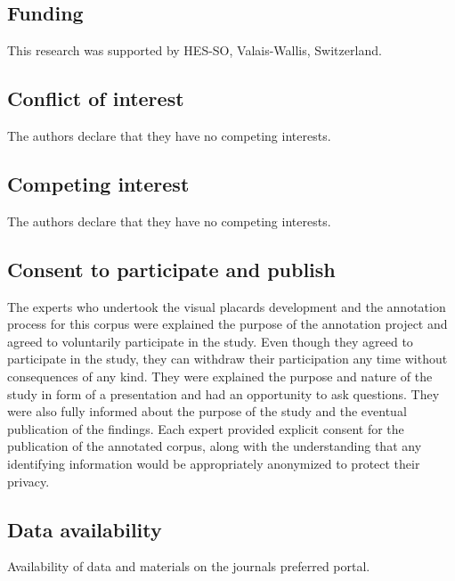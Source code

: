 \documentclass[sn-mathphys,Numbered]{sn-jnl}%
\theoremstyle{thmstyleone}%
\theoremstyle{thmstyletwo}%
\theoremstyle{thmstylethree}%
\begin{document}
\subsection*{Funding}
%
This research was supported by HES-SO, Valais-Wallis, Switzerland. 
%
%
%
\subsection*{Conflict of interest}
%
The authors declare that they have no competing interests.
%
%
%
\subsection*{Competing interest}
%
The authors declare that they have no competing interests.
%
%
%
%
%
%
%
\subsection*{Consent to participate and publish}
%
The experts who undertook the visual placards development and the annotation process for this corpus were explained the purpose of the annotation project and agreed to voluntarily participate in the study.
Even though they agreed to participate in the study, they can withdraw their participation any time without consequences of any kind.
They were explained the purpose and nature of the study in form of a presentation and had an opportunity to ask questions.
They were also fully informed about the purpose of the study and the eventual publication of the findings.
Each expert provided explicit consent for the publication of the annotated corpus, along with the understanding that any identifying information would be appropriately anonymized to protect their privacy. 
%
%
%
\subsection*{Data availability}
%
Availability of data and materials on the journals preferred portal.
%
%
%
\end{document}
